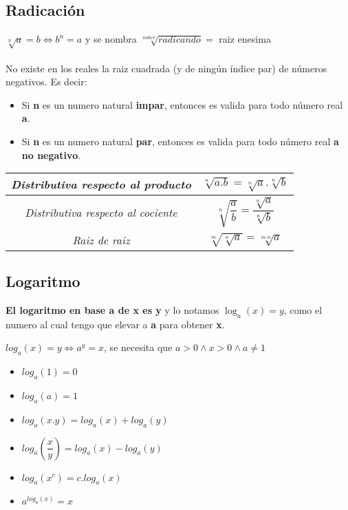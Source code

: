 \documentclass[10pt]{article}
\begin{document}
\subsection{Radicación}
$\sqrt[n]{a} = b \iff b^n=a$ \hfill y se nombra $\sqrt[indice]{radicando} =$ raiz enesima\\ \\
No existe en los reales la raiz cuadrada (y de ningún índice par) de números negativos. Es decir:
\begin{itemize}
\item Si \textbf{n} es un numero natural \textbf{impar}, entonces es valida para todo número real \textbf{a}.
\item Si \textbf{n} es un numero natural \textbf{par}, entonces es valida para todo número real \textbf{a no negativo}.
\end{itemize}
\begin{center}
\end{center}
\begin{table}[h]
\begin{center}
\begin{tabular}{|c|c|}
\hline
\textit{Distributiva respecto al producto} & $\sqrt[n]{a.b} = \sqrt[n]{a}.\sqrt[n]{b}$\\
\hline
\textit{Distributiva respecto al cociente} & $\sqrt[n]{\dfrac{a}{b}} = \dfrac{\sqrt[n]{a}}{\sqrt[n]{b}}$\\
\hline
\textit{Raiz de raiz} & $\sqrt[m]{\sqrt[n]{a}} = \sqrt[m.n]{a}$\\
\hline
\end{tabular}
\end{center}
\end{table}
\subsection{Logaritmo}
\textbf{El logaritmo en base a de x es y} y lo notamos $\log_a(x)=y$, como el numero al cual tengo que elevar a \textbf{a} para obtener \textbf{x}.
\begin{center}
$log_a(x)=y \iff a^y=x$, se necesita que $a>0 \land x>0 \land a \not = 1$
\end{center}
\begin{multicols}{2}
\begin{itemize}
\item $log_a(1)=0$
\item $log_a(a)=1$
\item $log_a(x.y)=log_a(x)+log_a(y)$
\item $log_a{\left(\dfrac{x}{y}\right)}=log_a(x)-log_a(y)$
\item $log_a(x^c) = c.log_a(x)$
\item $a^{log_a(x)}=x$
\end{itemize}
\end{multicols}
\begin{center}
\end{center}
\end{document}
